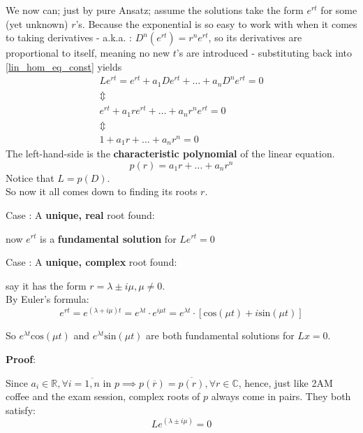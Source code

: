We now can; just by pure Ansatz; assume the solutions take the form $e^{rt}$ for some (yet unknown) $r$'s. Because the exponential is so easy to work with when it comes to taking derivatives - a.k.a. : $D^n(e^{rt})=r^ne^{rt}$, so its derivatives are proportional to itself, meaning no new $t$'s are introduced - substituting back into \ref{lin_hom_eq_const} yields
\begin{gather*}
  Le^{rt} = e^{rt} + a_1 De^{rt} + \dots +a_{n} D^ne^{rt} = 0      \\
  \Updownarrow \\
  e^{rt}+a_1re^{rt} + \dots + a_nr^ne^{rt} =0 \\
  \Updownarrow \\
  1 + a_1r + \dots + a_nr^n =0
\end{gather*}
The left-hand-side is the \textbf{characteristic polynomial} of the linear equation.
\begin{equation}\label{lin_eq_char_poly}
  p(r) = a_1r + \dots + a_nr^n
\end{equation}
Notice that $L = p(D)$. \\
So now it all comes down to finding its roots $r$.

Case : A \textbf{unique, real} root found:

now $e^{rt}$ is a \textbf{fundamental solution} for $Le^{rt}=0$

Case : A \textbf{unique, complex} root found:

say it has the form $r = \lambda \pm i\mu, \mu \neq 0$. \\
By Euler's formula:
\begin{equation}\label{euler}
  e^{rt} = e^{(\lambda + i\mu)t} = e^{\lambda t} \cdot e^{i \mu t}  =  e^{\lambda t} \cdot [\text{cos}(\mu t) + i \text{sin}(\mu t)]
\end{equation}

So $e^{\lambda t}\text{cos}(\mu t)$ and $e^{\lambda t}\text{sin}(\mu t)$ are both fundamental solutions for $Lx=0$.

\textbf{Proof}: \par
Since $a_i \in \mathbb{R}, \forall i=\overline{1,n}$ in $p \implies p(\overline{r})=\overline{p(r)}, \forall r \in \mathbb{C}$, hence, just like 2AM coffee and the exam session, complex roots of $p$ always come in pairs. They both satisfy:
\begin{equation}\label{lin_op_solution}
  Le^{(\lambda \pm i \mu)} = 0
\end{equation}

